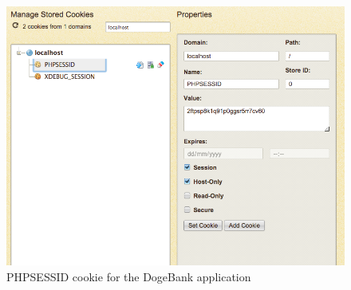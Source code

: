 \begin{figure}
	\centering
	\includegraphics[width=\textwidth]{figures/Doge_Session_Cookie.png}
	\caption{PHPSESSID cookie for the DogeBank application}
\end{figure}


